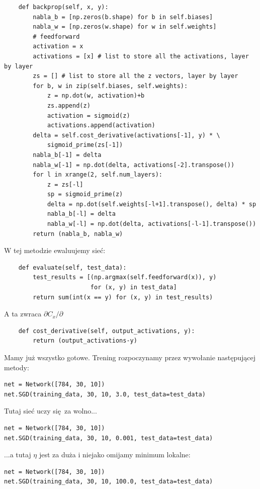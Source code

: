 \documentclass[10pt, oneside]{article}
\theoremstyle{remark}
\begin{document}
\begin{verbatim}
    def backprop(self, x, y):
        nabla_b = [np.zeros(b.shape) for b in self.biases]
        nabla_w = [np.zeros(w.shape) for w in self.weights]
        # feedforward
        activation = x
        activations = [x] # list to store all the activations, layer by layer
        zs = [] # list to store all the z vectors, layer by layer
        for b, w in zip(self.biases, self.weights):
            z = np.dot(w, activation)+b
            zs.append(z)
            activation = sigmoid(z)
            activations.append(activation)
        delta = self.cost_derivative(activations[-1], y) * \
            sigmoid_prime(zs[-1])
        nabla_b[-1] = delta
        nabla_w[-1] = np.dot(delta, activations[-2].transpose())
        for l in xrange(2, self.num_layers):
            z = zs[-l]
            sp = sigmoid_prime(z)
            delta = np.dot(self.weights[-l+1].transpose(), delta) * sp
            nabla_b[-l] = delta
            nabla_w[-l] = np.dot(delta, activations[-l-1].transpose())
        return (nabla_b, nabla_w)
\end{verbatim}
W tej metodzie ewaluujemy sieć:
\begin{verbatim}
    def evaluate(self, test_data):
        test_results = [(np.argmax(self.feedforward(x)), y)
                        for (x, y) in test_data]
        return sum(int(x == y) for (x, y) in test_results)
\end{verbatim}
A ta zwraca $\partial C_x / \partial$
\begin{verbatim}
    def cost_derivative(self, output_activations, y):
        return (output_activations-y)
\end{verbatim}


Mamy już wszystko gotowe. 
Trening rozpoczynamy przez wywołanie następującej metody:
\begin{verbatim}
net = Network([784, 30, 10])
net.SGD(training_data, 30, 10, 3.0, test_data=test_data)	
\end{verbatim}
Tutaj sieć uczy się za wolno...
\begin{verbatim}
net = Network([784, 30, 10])
net.SGD(training_data, 30, 10, 0.001, test_data=test_data)	
\end{verbatim}
...a tutaj $\eta$ jest za duża i niejako omijamy minimum lokalne:
\begin{verbatim}
net = Network([784, 30, 10])
net.SGD(training_data, 30, 10, 100.0, test_data=test_data)	
\end{verbatim}
\end{document}
